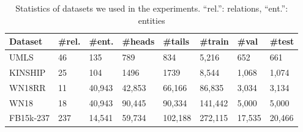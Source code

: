\begin{table}[t]
\small
\centering
\begin{tabular}{|l|l|l|l|l||l|l|l|}
    \hline
    \textbf{Dataset} & \textbf{\#rel.} & \textbf{\#ent.} & 
    \textbf{\#heads} & \textbf{\#tails} &
    \textbf{\#train} & \textbf{\#val} & \textbf{\#test} \\ \hline
    UMLS & 46 & 135 & 789 & 834 & 5,216 & 652 & 661 \\ \hline
    KINSHIP & 25 & 104 & 1496 & 1739 & 8,544 & 1,068 & 1,074 \\ \hline \hline
    WN18RR & 11 & 40,943 & 42,853 & 66,166 & 86,835 & 3,034 & 3,134 \\ \hline
    WN18 & 18 & 40,943 & 90,445 & 90,334 & 141,442 & 5,000 & 5,000 \\ \hline
    FB15k-237 & 237 & 14,541 & 59,734 & 102,188 & 272,115 & 17,535 & 20,466 \\ \hline
    
    
    \end{tabular}
    \caption{Statistics of datasets we used in the experiments. ``rel.'': relations, ``ent.'': entities}
    \label{tab:datasets}
\end{table}